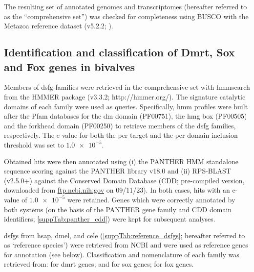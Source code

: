 The resulting set of annotated genomes and transcriptomes (hereafter referred to as the “comprehensive set”) was checked for completeness using BUSCO with the Metazoa reference dataset (v5.2.2; \textbf{\cite{manni2021busco}}).

\subsection{Identification and classification of Dmrt, Sox and Fox genes in bivalves}
Members of \gls{dsfg} families were retrieved in the comprehensive set with hmmsearch from the HMMER package (v3.3.2; http://hmmer.org/). The signature catalytic domains of each family were used as queries. Specifically, \gls{hmm} profiles were built after the Pfam databases for the \gls{dm} domain (PF00751), the \gls{hmg} box (PF00505) and the forkhead domain (PF00250) to retrieve members of the \gls{dsfg} families, respectively. The e-value for both the per-target and the per-domain inclusion threshold was set to $\num{1.0e-5}$.

Obtained hits were then annotated using (i) the PANTHER HMM standalone sequence scoring against the PANTHER library v18.0 and (ii) RPS-BLAST (v2.5.0+) against the Conserved Domain Database (CDD; pre-compiled version, downloaded from \href{https://ftp.ncbi.nih.gov/pub/mmdb/cdd/little_endian/}{ftp.ncbi.nih.gov} on 09/11/23). In both cases, hits with an e-value of $\num{1.0e-5}$ were retained. Genes which were correctly annotated by both systems (on the basis of the PANTHER gene family and CDD domain identifiers; \cref{suppTab:panther_cdd}) were kept for subsequent analyses.

\glspl{dsfg} from \gls{hsap}, \gls{dmel}, and \gls{cele} (\cref{suppTab:reference_dsfgs}; hereafter referred to as ‘reference species’) were retrieved from NCBI and were used as reference genes for annotation (see below). Classification and nomenclature of each family was retrieved from: \textbf{\cite{mawaribuchi2019independent}} for \gls{dmrt} genes; \textbf{\cite{phochanukul2010no}} and \textbf{\cite{sarkar2013sox}} for \gls{sox} genes; \textbf{\cite{mazet2003phylogenetic}} for \gls{fox} genes.

